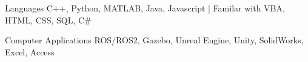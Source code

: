 
\begin{cvskills}
  \cvskill
    {Languages} %
    {C++, Python, MATLAB, Java, Javascript | Familar with VBA, HTML, CSS, SQL, C\#} %

  \cvskill
    {Computer Applications} %
    {ROS/ROS2, Gazebo, Unreal Engine, Unity, SolidWorks, Excel, Access} %
\end{cvskills}
